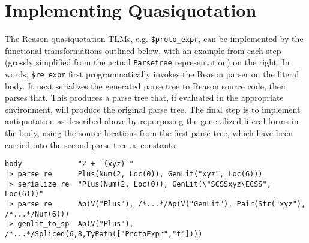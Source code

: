 \documentclass[12pt]{report}
\newcommand{\li}[1]{\lstinline[basicstyle=\ttfamily\fontsize{10pt}{1em}\selectfont]{#1}}
\begin{document}
\chapter{Implementing Quasiquotation} The Reason quasiquotation TLMs, e.g. \li{$proto_expr}, can be implemented by the functional transformations outlined below, with an example from each step (grossly simplified from the actual \li{Parsetree} representation) on the right. In words, \li{$re_expr} first programmatically invokes the Reason parser on the literal body. It next serializes the generated parse tree to Reason source code, then parses that. This produces a parse tree that, if evaluated in the appropriate environment, will produce the original parse tree. The final step is to implement antiquotation as described above by repurposing the generalized literal forms in the body, using the source locations from the first parse tree, which have  been carried into the second parse tree as constants.
\begin{lstlisting}[numbers=none,basicstyle=\ttfamily\fontsize{8.3pt}{1em}\selectfont]
body             "2 + `(xyz)`" 
|> parse_re      Plus(Num(2, Loc(0)), GenLit("xyz", Loc(6)))
|> serialize_re  "Plus(Num(2, Loc(0)), GenLit(\"SCSSxyz\ECSS", Loc(6)))"
|> parse_re      Ap(V("Plus"), /*...*/Ap(V("GenLit"), Pair(Str("xyz"), /*...*/Num(6)))
|> genlit_to_sp  Ap(V("Plus"), /*...*/Spliced(6,8,TyPath(["ProtoExpr","t"])))
\end{lstlisting}



\end{document}

